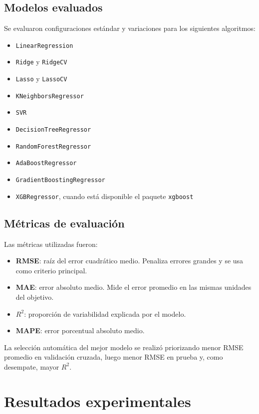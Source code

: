 \documentclass[12pt,letterpaper]{article}
\begin{document}
\subsection{Modelos evaluados}
Se evaluaron configuraciones estándar y variaciones para los siguientes algoritmos:
\begin{itemize}
    \item \texttt{LinearRegression}
    \item \texttt{Ridge} y \texttt{RidgeCV}
    \item \texttt{Lasso} y \texttt{LassoCV}
    \item \texttt{KNeighborsRegressor}
    \item \texttt{SVR}
    \item \texttt{DecisionTreeRegressor}
    \item \texttt{RandomForestRegressor}
    \item \texttt{AdaBoostRegressor}
    \item \texttt{GradientBoostingRegressor}
    \item \texttt{XGBRegressor}, cuando está disponible el paquete \texttt{xgboost}
\end{itemize}

\subsection{Métricas de evaluación}
Las métricas utilizadas fueron:
\begin{itemize}
    \item \textbf{RMSE}: raíz del error cuadrático medio. Penaliza errores grandes y se usa como criterio principal.
    \item \textbf{MAE}: error absoluto medio. Mide el error promedio en las mismas unidades del objetivo.
    \item \textbf{$R^2$}: proporción de variabilidad explicada por el modelo.
    \item \textbf{MAPE}: error porcentual absoluto medio.
\end{itemize}

La selección automática del mejor modelo se realizó priorizando menor RMSE promedio en validación cruzada, luego menor RMSE en prueba y, como desempate, mayor $R^2$.

\section{Resultados experimentales}
\end{document}
